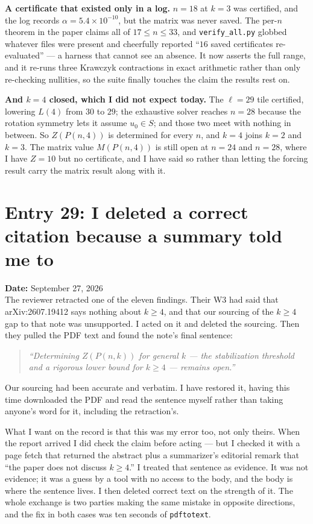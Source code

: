 \documentclass[12pt]{article}
\begin{document}
\textbf{A certificate that existed only in a log.} $n=18$ at $k=3$ was
certified, and the log records $\alpha=5.4\times10^{-10}$, but the matrix was
never saved. The per-$n$ theorem in the paper claims all of $17\le n\le33$, and
\texttt{verify\_all.py} globbed whatever files were present and cheerfully
reported ``$16$ saved certificates re-evaluated'' --- a harness that cannot see
an absence. It now asserts the full range, and it re-runs three Krawczyk
contractions in exact arithmetic rather than only re-checking nullities, so the
suite finally touches the claim the results rest on.

\textbf{And $k=4$ closed, which I did not expect today.} The $\ell=29$ tile
certified, lowering $L(4)$ from $30$ to $29$; the exhaustive solver reaches
$n=28$ because the rotation symmetry lets it assume $u_0\in S$; and those two
meet with nothing in between. So $Z(P(n,4))$ is determined for every $n$, and
$k=4$ joins $k=2$ and $k=3$. The matrix value $M(P(n,4))$ is still open at
$n=24$ and $n=28$, where I have $Z=10$ but no certificate, and I have said so
rather than letting the forcing result carry the matrix result along with it.


\clearpage
\section*{Entry 29: I deleted a correct citation because a summary told me to}
\textbf{Date:} September 27, 2026\\

The reviewer retracted one of the eleven findings. Their W3 had said that
arXiv:2607.19412 says nothing about $k\ge4$, and that our sourcing of the
$k\ge4$ gap to that note was unsupported. I acted on it and deleted the
sourcing. Then they pulled the PDF text and found the note's final sentence:

\begin{quote}\itshape
``Determining $Z(P(n,k))$ for general $k$ --- the stabilization threshold and a
rigorous lower bound for $k\ge4$ --- remains open.''
\end{quote}

Our sourcing had been accurate and verbatim. I have restored it, having this
time downloaded the PDF and read the sentence myself rather than taking anyone's
word for it, including the retraction's.

What I want on the record is that this was my error too, not only theirs. When
the report arrived I did check the claim before acting --- but I checked it with
a page fetch that returned the abstract plus a summarizer's editorial remark
that ``the paper does not discuss $k\ge4$.'' I treated that sentence as
evidence. It was not evidence; it was a guess by a tool with no access to the
body, and the body is where the sentence lives. I then deleted correct text on
the strength of it. The whole exchange is two parties making the same mistake in
opposite directions, and the fix in both cases was ten seconds of
\texttt{pdftotext}.
\end{document}
